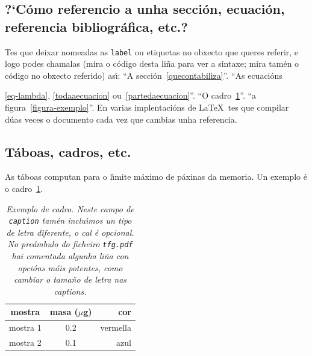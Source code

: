 \subsection{?`C\'omo referencio a unha secci\'on, ecuaci\'on, referencia bibliogr\'afica, etc.?}
Tes que deixar nomeadas as {\tt label} ou etiquetas no obxecto que queres referir, e logo podes chamalas (mira o c\'odigo desta li\~na para ver a sintaxe; mira tam\'en o c\'odigo no obxecto referido) as\'{\i}: ``A secci\'on~\ref{quecontabiliza}''. ``As ecuaci\'ons{\ref{eq-lambda}, \ref{todaaecuacion} ou~\ref{partedaecuacion}''. ``O cadro~\ref{taboa1}''. ``a figura~\ref{figura-exemplo}''. En varias implentaci\'ons de \LaTeX\ tes que compilar d\'uas veces o documento cada vez que cambias unha referencia.


\subsection{T\'aboas, cadros, etc.}
As t\'aboas computan para o l\'{\i}mite m\'aximo de p\'axinas da memoria. Un exemplo \'e o cadro~\ref{taboa1}.
%
\begin{table}[h]
\begin{center}\begin{tabular}{|c|c|r|}
\hline
mostra & masa ($\mu$g) & cor\\
\hline 
mostra 1 & 0.2 & vermella\\
mostra 2 & 0.1 & azul\\
\hline
\end{tabular}\end{center}
\caption{\sl Exemplo de cadro. Neste campo de  {\tt caption} tam\'en inclu\'{\i}mos un tipo de letra diferente, o cal \'e opcional. No pre\'ambulo do ficheiro  {\tt tfg.pdf} hai comentada algunha li\~na con opci\'ons m\'ais potentes, como cambiar o tama\~no de letra nas captions.}\label{taboa1}
\end{table}
%

}
